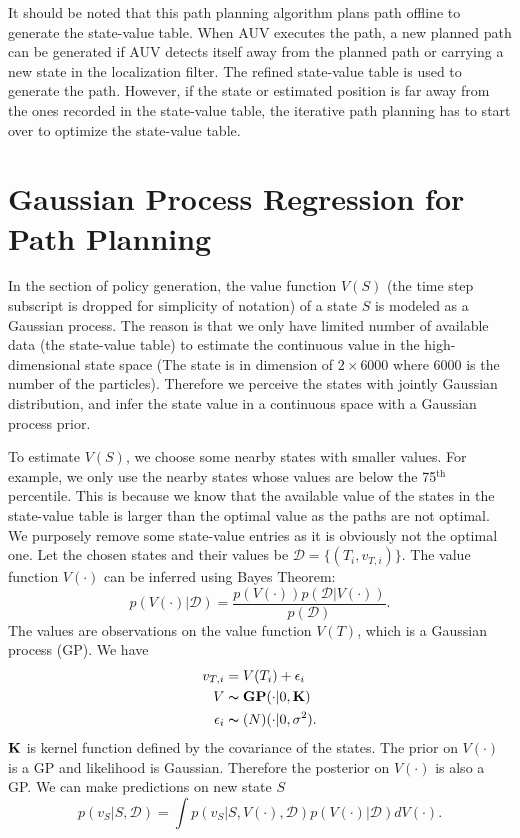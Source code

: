 It should be noted that this path planning algorithm plans path offline to generate the state-value table. When AUV executes the path, a new planned path can be generated if AUV detects itself away from the planned path or carrying a new state in the localization filter. The refined state-value table is used to generate the path. However, if the state or estimated position is far away from the ones recorded in the state-value table, the iterative path planning has to start over to optimize the state-value table.

\section{Gaussian Process Regression for Path Planning}
\label{sec:GPR}
In the section of policy generation, the value function $V(S)$ (the time step subscript is dropped for simplicity of notation) of a state $S$ is modeled as a Gaussian process. The reason is that we only have limited number of available data (the state-value table) to estimate the continuous value in the high-dimensional state space (The state is in dimension of $2\times 6000$ where $6000$ is the number of the particles). Therefore we perceive the states with jointly Gaussian distribution, and infer the state value in a continuous space with a Gaussian process prior. 

To estimate $V(S)$, we choose some nearby states with smaller values. For example, we only use the nearby states whose values are below the 75$^\text{th}$ percentile. This is because we know that the available value of the states in the state-value table is larger than the optimal value as the paths are not optimal. We purposely remove some state-value entries as it is obviously not the optimal one. Let the chosen states and their values be $\mathcal{D}=\{(T_i,v_{T,i})\}$. The value function $V(\cdot)$ can be inferred using Bayes Theorem:
\begin{equation}
    p(V(\cdot)|\mathcal{D})=\frac{p(V(\cdot))p(\mathcal{D}|V(\cdot))}{p(\mathcal{D})}.
\end{equation}
The values are observations on the value function $V(T)$, which is a Gaussian process (GP). We have
\begin{equation}
    \begin{aligned}
    v_{T,i}&=V(T_i)+\epsilon_i \\
    V&\thicksim \textbf{GP}(\cdot|0, {\bf K}) \\
    \epsilon_i&\thicksim\mathcal(N)(\cdot|0,\sigma^2).
    \end{aligned}
\end{equation}
$\bf K$ is kernel function defined by the covariance of the states. The prior on $V(\cdot)$ is a GP and likelihood is Gaussian. Therefore the posterior on $V(\cdot)$ is also a GP. We can make predictions on new state $S$
\begin{equation}
    p(v_S|S, \mathcal{D})=\int p(v_S|S,V(\cdot),\mathcal{D})p(V(\cdot)|\mathcal{D})dV(\cdot).
\end{equation}

